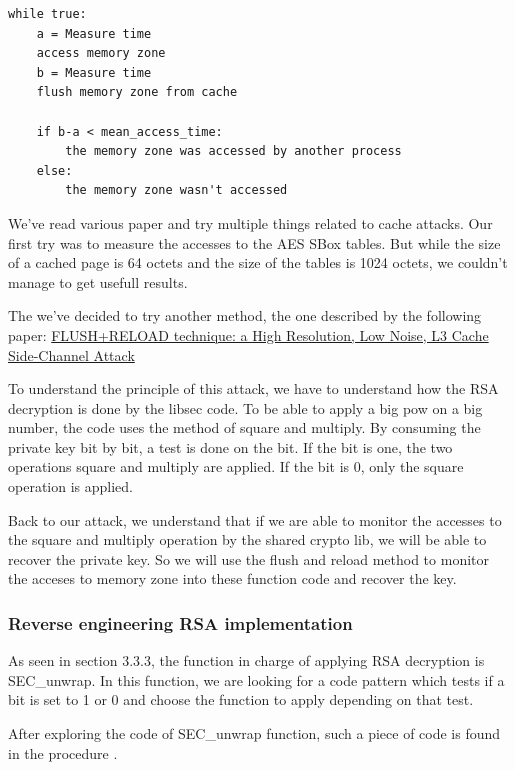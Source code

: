 \documentclass[a4paper]{article}
\begin{document}
\begin{lstlisting}[caption={Cache attack pseudocode},numbers=none,style=colortilde]
while true:
    a = Measure time
    access memory zone
    b = Measure time
    flush memory zone from cache

    if b-a < mean_access_time:
        the memory zone was accessed by another process
    else:
        the memory zone wasn't accessed
\end{lstlisting}
\newpage
We've read various paper and try multiple things related to cache attacks. 
Our first try was to measure the accesses to the AES SBox tables. But while the size of a cached page is 64 octets and the size of the tables is 1024 octets, we couldn't manage to get usefull results. \newline

The we've decided to try another method, the one described by the following paper: \href{https://eprint.iacr.org/2013/448.pdf}{FLUSH+RELOAD technique: a High Resolution, Low Noise, L3 Cache Side-Channel Attack}\newline

To understand the principle of this attack, we have to understand how the RSA decryption is done by the libsec code. To be able to apply a big pow on a big number, the code uses the method of square and multiply. By consuming the private key bit by bit, a test is done on the bit. If the bit is one, the two operations square and multiply are applied. If the bit is 0, only the square operation is applied.

Back to our attack, we understand that if we are able to monitor the accesses to the square and multiply operation by the shared crypto lib, we will be able to recover the private key. So we will use the flush and reload method to monitor the acceses to memory zone into these function code and recover the key.

\subsubsection{Reverse engineering RSA implementation}
As seen in section 3.3.3, the function in charge of applying RSA decryption is SEC\_unwrap. In this function, we are looking for a code pattern which tests if a bit is set to 1 or 0 and choose the function to apply depending on that test.

After exploring the code of SEC\_unwrap function, such a piece of code is found in the procedure .\newline
\end{document}
